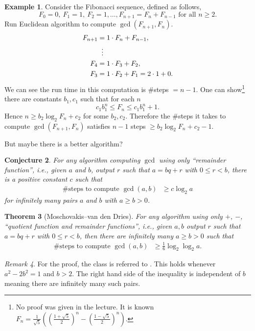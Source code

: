 \documentclass{amsbook}
\theoremstyle{plain}
\newtheorem{theorem}{Theorem}[chapter] %
\newtheorem{conjecture}[theorem]{Conjecture}
\theoremstyle{definition}
\newtheorem{example}[theorem]{Example}
\theoremstyle{remark}
\newtheorem{remark}[theorem]{Remark}
\numberwithin{equation}{chapter}
\numberwithin{figure}{chapter}
\begin{document}
\begin{example}
Consider the Fibonacci sequence, defined as follows,
\[
F_0 = 0, ~F_1 = 1, ~F_2 = 1, \ldots, F_{n+1} = F_n + F_{n-1} \text{ for all $n \geqslant 2$}.
\]
Run Euclidean algorithm to compute $\gcd (F_{n+1}, F_n)$.
\begin{align}
  F_{n+1} &= 1 \cdot F_n + F_{n-1}, \\
   & \hspace{2mm} \vdots\\
  F_4 &= 1 \cdot F_3 + F_2, \\
  F_3 &= 1 \cdot F_2 + F_1 = 2 \cdot 1 + 0.
\end{align}
We can see the run time in this computation is \#steps $= n - 1$. One can show\footnote{No proof was given in the lecture. It is known $\displaystyle F_n = \frac{1}{\sqrt 5} \left( \left( \frac{1 + \sqrt 5}2 \right)^n - \left( \frac{1 - \sqrt 5}2 \right)^n \right)$.} there are constants $b_1, c_1$ such that for each $n$
\[
  c_1b_1^n \leqslant F_n \leqslant c_1 b_1^n + 1.
\]
Hence $n \geqslant b_2 \log_2 F_n + c_2$ for some $b_2, c_2$. Therefore the \#steps it takes to compute $\gcd (F_{n+1}, F_n)$ satisfies $n-1$ steps $\geqslant b_2 \log_2 F_n + c_2 -1$.
\end{example}
But maybe there is a better algorithm?
\begin{conjecture}
  For any algorithm computing $\gcd$ using only ``remainder function'', i.e., given $a$ and $b$, output $r$ such that $a = bq + r$ with $0 \leqslant r < b$, there is a positive constant $c$ such that
  \begin{align}
    \text{\#steps to compute $\gcd(a, b)$ } \geqslant c \log_2 a
  \end{align}
  for infinitely many pairs $a$ and $b$ with $a \geqslant b > 0$.
\end{conjecture}
\begin{theorem}[Moschovakis--van den Dries]
  For any algorithm using only $+$, $-$, ``quotient function and remainder functions'', i.e., given $a, b$ output $r$ such that $a = bq + r$ with $0 \leqslant r < b$, then there are infinitely many $a \geqslant b > 0$ such that
  \begin{align}
    \text{\#steps to compute $\gcd(a, b)$ } \geqslant \frac{1}6 \log_2 \log_2 a.
  \end{align}
\end{theorem}
\begin{remark}
  For the proof, the class is referred to \cite{Moschovakis2004}. This holds whenever $a^2 - 2b^2 = 1$ and $b > 2$. The right hand side of the inequality is independent of $b$ meaning there are infinitely many such pairs.
\end{remark}
\end{document}
